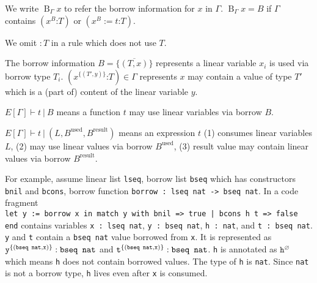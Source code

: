 \documentclass[a4paper,fleqn]{article}
\newcommand{\lassum}[2]{(#1\mathord{:}#2)}
\newcommand{\ldef}[3]{(#1:=#2\mathord{:}#3)}
\DeclareMathOperator{\Bop}{B}
\begin{document}
We write $\Bop_\Gamma x$ to refer the borrow information for $x$ in $\Gamma$.
$\Bop_\Gamma x = B$ if $\Gamma$ contains $\lassum{x^B}{T}$ or $\ldef{x^B}{t}{T}$.

We omit $:T$ in a rule which does not use $T$.

The borrow information $B=\{\overline{(T,x)}\}$ represents a linear variable $x_i$ is used via borrow type $T_i$.
$\lassum{x^{\{(T',y)\}}}{T}\in \Gamma$ represents $x$ may contain a value of type $T'$ which is a (part of) content of the linear variable $y$.

$E[\Gamma] \vdash t~|~B$ means a function $t$ may use linear variables via borrow $B$.

$E[\Gamma] \vdash t~|~(L, B^\text{used}, B^\text{result})$ means an expression $t$
(1) consumes linear variables $L$,
(2) may use linear values via borrow $B^\text{used}$,
(3) result value may contain linear values via borrow $B^\text{result}$.

For example, assume linear list \lstinline!lseq!, borrow list \lstinline!bseq! which has constructors \lstinline!bnil! and \lstinline!bcons!,
borrow function \lstinline!borrow : lseq nat -> bseq nat!.
In a code fragment \\
\lstinline!let y := borrow x in match y with bnil => true | bcons h t => false end! contains variables
\lstinline!x : lseq nat!,
\lstinline!y : bseq nat!,
\lstinline!h : nat!, and
\lstinline!t : bseq nat!.
\texttt{y} and \texttt{t} contain a \texttt{bseq nat} value borrowed from \texttt{x}.
It is represented as
$\texttt{y}^{\{(\texttt{bseq nat},\texttt{x})\}}:\text{\texttt{bseq nat}}$ and
$\texttt{t}^{\{(\texttt{bseq nat},\texttt{x})\}}:\text{\texttt{bseq nat}}$.
\texttt{h} is annotated as $\texttt{h}^\varnothing$ which means \texttt{h} does not contain borrowed values.
The type of \texttt{h} is \texttt{nat}.
Since \texttt{nat} is not a borrow type, \texttt{h} lives even after \texttt{x} is consumed.
\end{document}
